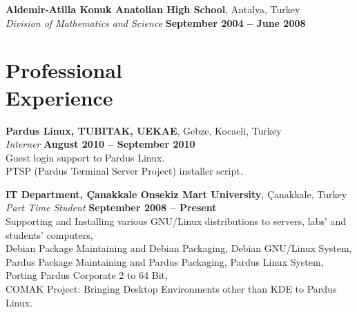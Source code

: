 \documentclass[margin,line]{resume}
\begin{document}
\begin{resume}
    \textbf{Aldemir-Atilla Konuk Anatolian High School}, Antalya, Turkey \vspace{2mm}\\\vspace{1mm}%
    \textsl{Division of Mathematics and Science} \hfill \textbf{ September 2004 -- June 2008}\vspace{-3mm}\\\vspace{-1mm}%

%
%
%
%
    \section{\mysidestyle Professional\\Experience}

    \textbf{Pardus Linux, TUBITAK, UEKAE}, Gebze, Kocaeli, Turkey \vspace{2mm}\\\vspace{1mm}%
    \textsl{Interner} \hfill \textbf{August 2010 -- September 2010}\\
    Guest login support to Pardus Linux. \\
    PTSP (Pardus Terminal Server Project) installer script.

    \textbf{IT Department, Çanakkale Onsekiz Mart University}, Çanakkale, Turkey \vspace{2mm}\\\vspace{1mm}%
    \textsl{Part Time Student} \hfill \textbf{September 2008 -- Present}\\
   	Supporting and Installing various GNU/Linux distributions to servers, labs' and students' computers, \\
	Debian Package Maintaining and Debian Packaging, Debian GNU/Linux System, \\
	Pardus Package Maintaining and Pardus Packaging, Pardus Linux System, \\
	Porting Pardus Corporate 2 to 64 Bit, \\
	COMAK Project: Bringing Desktop Environments other than KDE to Pardus Linux.



\end{resume}
\end{document}
